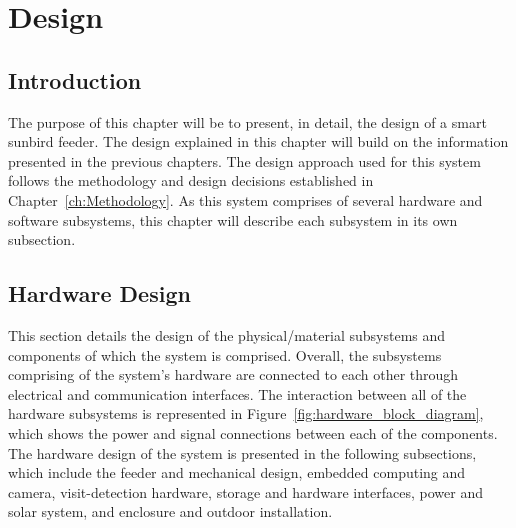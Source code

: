 
\glsresetall %
\chapter[Design]{Design}\label{ch:Design}

\section{Introduction}
\label{sec:DesignIntroduction}

The purpose of this chapter will be to present, in detail, the design of a smart sunbird feeder. The design explained in this chapter will build on the information presented in the previous chapters. The design approach used for this system follows the methodology and design decisions established in Chapter~\ref{ch:Methodology}. As this system comprises of several hardware and software subsystems, this chapter will describe each subsystem in its own subsection. 

\section{Hardware Design}
\label{sec:HardwareDesign}

This section details the design of the physical/material subsystems and components of which the system is comprised. Overall, the subsystems comprising of the system's hardware are connected to each other through electrical and communication interfaces. The interaction between all of the hardware subsystems is represented in Figure~\ref{fig:hardware_block_diagram}, which shows the power and signal connections between each of the components. The hardware design of the system is presented in the following subsections, which include the feeder and mechanical design, embedded computing and camera, visit-detection hardware, storage and hardware interfaces, power and solar system, and enclosure and outdoor installation.

